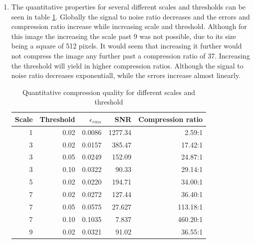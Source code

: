 \documentclass[a4paper]{article}
\begin{document}
\begin{enumerate}

\item
The quantitative properties for several different scales and thresholds can be seen in table \ref{tab:results}.
Globally the signal to noise ratio decreases and the errors and compression ratio increase while increasing scale and threshold.
Although for this image the increasing the scale past 9 was not possible, due to its size being a square of 512 pixels.
It would seem that increasing it further would not compress the image any further past a compression ratio of 37.
Increasing the threshold will yield in higher compression ratios. Although the signal to noise ratio decreases exponentiall, while
the errors increase almost linearly.
\begin{table}[H]
\centering
\begin{tabular}{r|r|r|r|r}
 \textbf{Scale} & \textbf{Threshold} & \textbf{$\epsilon_{rms}$} & \textbf{SNR} & \textbf{Compression ratio}\\
 \hline
 1 & 0.02 & 0.0086 & 1277.34 & 2.59:1 \\
 3 & 0.02 & 0.0157 &  385.47 & 17.42:1 \\
 3 & 0.05 & 0.0249 & 152.09  & 24.87:1 \\
 3 & 0.10 & 0.0322 & 90.33  & 29.14:1 \\
 5 & 0.02 & 0.0220 & 194.71  & 34.00:1 \\
 7 & 0.02 & 0.0272 & 127.44  & 36.40:1 \\
 7 & 0.05 & 0.0575 & 27.627  & 113.18:1 \\
 7 & 0.10 & 0.1035 & 7.837  & 460.20:1 \\
 9 & 0.02 & 0.0321 & 91.02   & 36.55:1 \\
\end{tabular}
\caption{Quantitative compression quality for different scales and threshold}
\label{tab:results}
\end{table}


\end{enumerate}
\end{document}
